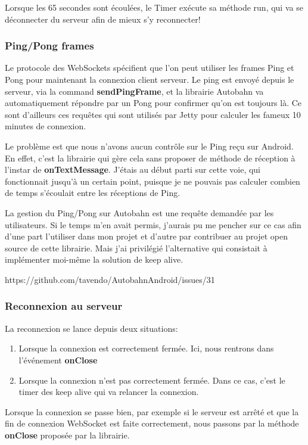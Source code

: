 Lorsque les 65 secondes sont écoulées, le Timer exécute sa méthode run, qui va se déconnecter du serveur afin de mieux s'y reconnecter!

\subsubsection{Ping/Pong frames}
Le protocole des WebSockets spécifient que l'on peut utiliser les frames Ping et Pong pour maintenant la connexion client serveur. Le ping est envoyé depuis le serveur, via la command \textbf{sendPingFrame}, et la librairie Autobahn va automatiquement répondre par un Pong pour confirmer qu'on est toujours là. Ce sont d'ailleurs ces requêtes qui sont utilisés par Jetty pour calculer les fameux 10 minutes de connexion.

\medskip

Le problème est que nous n'avons aucun contrôle sur le Ping reçu sur Android. En effet, c'est la librairie qui gère cela sans proposer de méthode de réception à l'instar de \textbf{onTextMessage}. J'étais au début parti sur cette voie, qui fonctionnait jusqu'à un certain point, puisque je ne pouvais pas calculer combien de temps s'écoulait entre les réceptions de Ping.

\medskip

La gestion du Ping/Pong sur Autobahn est une requête demandée par les utilisateurs. Si le temps m'en avait permis, j'aurais pu me pencher sur ce cas afin d'une part l'utiliser dans mon projet et d'autre par contribuer au projet open source de cette librairie. Mais j'ai privilégié l'alternative qui consistait à implémenter moi-même la solution de keep alive.

https://github.com/tavendo/AutobahnAndroid/issues/31
\subsubsection{Reconnexion au serveur}
La reconnexion se lance depuis deux situations:
\begin{enumerate}
	\item Lorsque la connexion est correctement fermée. Ici, nous rentrons dans l'événement \textbf{onClose}
	\item Lorsque la connexion n'est pas correctement fermée. Dans ce cas, c'est le timer des keep alive qui va relancer la connexion.
\end{enumerate}

Lorsque la connexion se passe bien, par exemple si le serveur est arrêté et que la fin de connexion WebSocket est faite correctement, nous passons par la méthode \textbf{onClose} proposée par la librairie.

